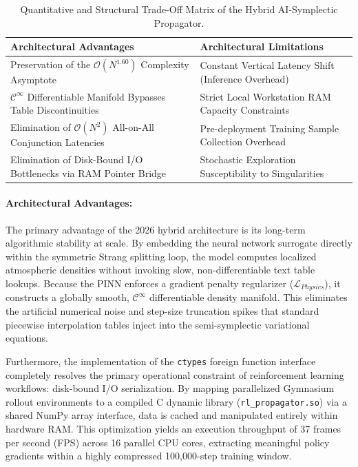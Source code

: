\documentclass[letterpaper,11pt]{AAS}
\begin{document}
\begin{table}[hbt!]
    \centering
    \caption{Quantitative and Structural Trade-Off Matrix of the Hybrid AI-Symplectic Propagator.}
    \label{tab:pros_cons_tradeoffs}
    \begin{tabular}{p{} p{}}
        \toprule
        \textbf{Architectural Advantages} & \textbf{Architectural Limitations} \\
        \midrule
        Preservation of the $\mathcal{O}(N^{1.60})$ Complexity Asymptote & Constant Vertical Latency Shift (Inference Overhead) \\ \addlinespace
        $\mathcal{C}^\infty$ Differentiable Manifold Bypasses Table Discontinuities & Strict Local Workstation RAM Capacity Constraints \\ \addlinespace
        Elimination of $\mathcal{O}(N^2)$ All-on-All Conjunction Latencies & Pre-deployment Training Sample Collection Overhead \\ \addlinespace
        Elimination of Disk-Bound I/O Bottlenecks via RAM Pointer Bridge & Stochastic Exploration Susceptibility to Singularities \\
        \bottomrule
    \end{tabular}
\end{table}

\paragraph{Architectural Advantages:}
The primary advantage of the 2026 hybrid architecture is its long-term algorithmic stability at scale. By embedding the neural network surrogate directly within the symmetric Strang splitting loop, the model computes localized atmospheric densities without invoking slow, non-differentiable text table lookups. Because the PINN enforces a gradient penalty regularizer ($\mathcal{L}_{Physics}$), it constructs a globally smooth, $\mathcal{C}^\infty$ differentiable density manifold. This eliminates the artificial numerical noise and step-size truncation spikes that standard piecewise interpolation tables inject into the semi-symplectic variational equations. 

Furthermore, the implementation of the \texttt{ctypes} foreign function interface completely resolves the primary operational constraint of reinforcement learning workflows: disk-bound I/O serialization. By mapping parallelized Gymnasium rollout environments to a compiled C dynamic library (\texttt{rl\_propagator.so}) via a shared NumPy array interface, data is cached and manipulated entirely within hardware RAM. This optimization yields an execution throughput of 37 frames per second (FPS) across 16 parallel CPU cores, extracting meaningful policy gradients within a highly compressed 100,000-step training window.
\end{document}
